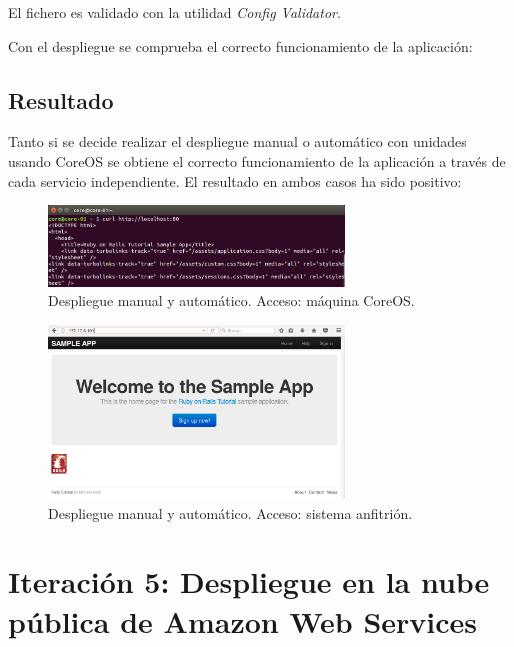 El fichero es validado con la utilidad \textit{Config Validator}. 

Con el despliegue se comprueba el correcto funcionamiento de la aplicación:


\subsection{Resultado}
Tanto si se decide realizar el despliegue manual o automático con unidades usando CoreOS se obtiene el correcto funcionamiento de la aplicación a través de cada servicio independiente.
El resultado en ambos casos ha sido positivo:

\begin{figure}[H]
\centering
\includegraphics[width=0.7\textwidth]{images/figures/coreosmanualcurl.png}
\caption{Despliegue manual y automático. Acceso: máquina CoreOS.}
\end{figure}

\begin{figure}[H]
\centering
\includegraphics[width=0.7\textwidth]{images/figures/coreosmanualhost.png}
\caption{Despliegue manual y automático. Acceso: sistema anfitrión.}
\end{figure}

\section[Iteración 5: Despliegue en Amazon Web Services]{Iteración 5: Despliegue en la nube pública de Amazon Web Services}

